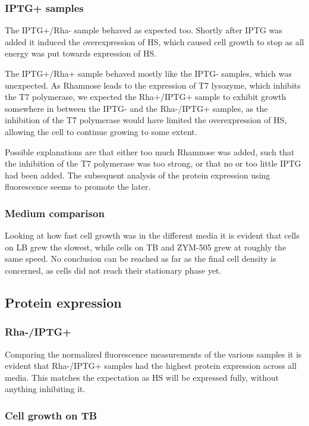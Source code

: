 \documentclass[a4paper]{scrreprt}
\begin{document}
\subsubsection{IPTG+ samples}

The IPTG+/Rha- sample behaved as expected too. Shortly after IPTG was added it
induced the overexpression of HS, which caused cell growth to stop as all
energy was put towards expression of HS.

The IPTG+/Rha+ sample behaved mostly like the IPTG- samples, which was
unexpected. As Rhamnose leads to the expression of T7 lysozyme, which inhibits
the T7 polymerase, we expected the Rha+/IPTG+ sample to exhibit growth
somewhere in between the IPTG- and the Rha-/IPTG+ samples, as the inhibition of
the T7 polymerase would have limited the overexpression of HS, allowing the
cell to continue growing to some extent.

Possible explanations are that either too much Rhamnose was added, such that
the inhibition of the T7 polymerase was too strong, or that no or too little
IPTG had been added. The subsequent analysis of the protein expression using
fluorescence seems to promote the later.

\subsubsection{Medium comparison}

Looking at how fast cell growth was in the different media it is evident that
cells on LB grew the slowest, while cells on TB and ZYM-505 grew at roughly the
same speed. No conclusion can be reached as far as the final cell density is
concerned, as cells did not reach their stationary phase yet.

\subsection{Protein expression}

\subsubsection{Rha-/IPTG+}

Comparing the normalized fluorescence measurements of the various samples it is
evident that Rha-/IPTG+ samples had the highest protein expression across all
media. This matches the expectation as HS will be expressed fully, without
anything inhibiting it.

\subsubsection{Cell growth on TB}
\end{document}
